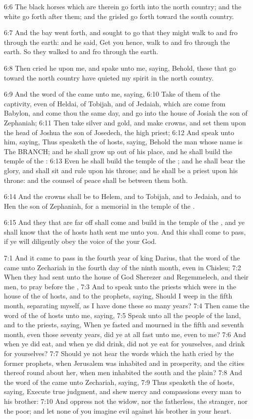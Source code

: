 6:6 The black horses which are therein go forth into the north
country; and the white go forth after them; and the grisled go forth
toward the south country.

6:7 And the bay went forth, and sought to go that they might walk to
and fro through the earth: and he said, Get you hence, walk to and fro
through the earth. So they walked to and fro through the earth.

6:8 Then cried he upon me, and spake unto me, saying, Behold, these
that go toward the north country have quieted my spirit in the north
country.

6:9 And the word of the \LORD came unto me, saying, 6:10 Take of them
of the captivity, even of Heldai, of Tobijah, and of Jedaiah, which
are come from Babylon, and come thou the same day, and go into the
house of Josiah the son of Zephaniah; 6:11 Then take silver and gold,
and make crowns, and set them upon the head of Joshua the son of
Josedech, the high priest; 6:12 And speak unto him, saying, Thus
speaketh the \LORD of hosts, saying, Behold the man whose name is The
BRANCH; and he shall grow up out of his place, and he shall build the
temple of the \LORD: 6:13 Even he shall build the temple of the \LORD;
and he shall bear the glory, and shall sit and rule upon his throne;
and he shall be a priest upon his throne: and the counsel of peace
shall be between them both.

6:14 And the crowns shall be to Helem, and to Tobijah, and to Jedaiah,
and to Hen the son of Zephaniah, for a memorial in the temple of the
\LORD.

6:15 And they that are far off shall come and build in the temple of
the \LORD, and ye shall know that the \LORD of hosts hath sent me unto
you. And this shall come to pass, if ye will diligently obey the voice
of the \LORD your God.

7:1 And it came to pass in the fourth year of king Darius, that the
word of the \LORD came unto Zechariah in the fourth day of the ninth
month, even in Chisleu; 7:2 When they had sent unto the house of God
Sherezer and Regemmelech, and their men, to pray before the \LORD, 7:3
And to speak unto the priests which were in the house of the \LORD of
hosts, and to the prophets, saying, Should I weep in the fifth month,
separating myself, as I have done these so many years?  7:4 Then came
the word of the \LORD of hosts unto me, saying, 7:5 Speak unto all the
people of the land, and to the priests, saying, When ye fasted and
mourned in the fifth and seventh month, even those seventy years, did
ye at all fast unto me, even to me?  7:6 And when ye did eat, and when
ye did drink, did not ye eat for yourselves, and drink for yourselves?
7:7 Should ye not hear the words which the \LORD hath cried by the
former prophets, when Jerusalem was inhabited and in prosperity, and
the cities thereof round about her, when men inhabited the south and
the plain?  7:8 And the word of the \LORD came unto Zechariah, saying,
7:9 Thus speaketh the \LORD of hosts, saying, Execute true judgment,
and shew mercy and compassions every man to his brother: 7:10 And
oppress not the widow, nor the fatherless, the stranger, nor the poor;
and let none of you imagine evil against his brother in your heart.

